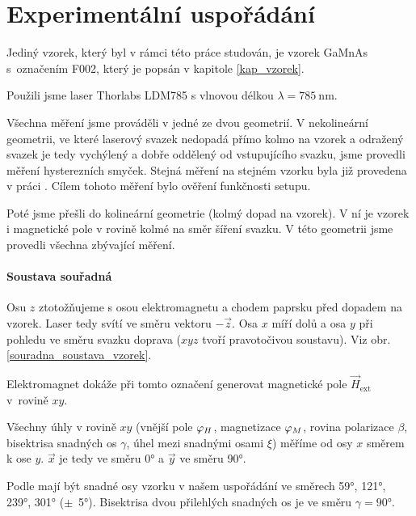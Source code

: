 \chapter{Experimentální uspořádání} \label{exp_usporadani}
Jediný vzorek, který byl v rámci této práce studován, je vzorek GaMnAs s~označením F002, který je popsán v kapitole \ref{kap_vzorek}.

Použili jsme laser Thorlabs LDM785 s vlnovou délkou $\lambda=\SI{785}{\nm}$.

Všechna měření jsme prováděli v jedné ze dvou geometrií. V nekolineární geometrii, ve které laserový svazek nedopadá přímo kolmo na vzorek a odražený svazek je tedy vychýlený a dobře oddělený od vstupujícího svazku, jsme provedli měření hysterezních smyček. Stejná měření na stejném vzorku byla již provedena v práci \cite{Reichlova}. Cílem tohoto měření bylo ověření funkčnosti setupu.

Poté jsme přešli do kolineární geometrie (kolmý dopad na vzorek). V ní je vzorek i magnetické pole v rovině kolmé na směr šíření svazku. V této geometrii jsme provedli všechna zbývající měření.


\subsubsection*{Soustava souřadná}
Osu $z$ ztotožňujeme s osou elektromagnetu a chodem paprsku před dopadem na vzorek. Laser tedy svítí ve směru vektoru $-\vec{z}$.
Osa $x$ míří dolů a osa $y$ při pohledu ve směru svazku doprava ($xyz$ tvoří pravotočivou soustavu). Viz obr. \ref{souradna_soustava_vzorek}.

Elektromagnet dokáže při tomto označení generovat magnetické pole $\vec{H}_{\text{ext}}$ v~rovině $xy$.

Všechny úhly v rovině $xy$ (vnější pole $\varphi_H$, magnetizace $\varphi_M$, rovina polarizace $\beta$, bisektrisa snadných os $\gamma$, úhel mezi snadnými osami $\xi$) měříme od osy $x$ směrem k ose $y$. $\vec{x}$ je tedy ve směru \ang{0} a  $\vec{y}$ ve směru \ang{90}.


Podle \cite{TesarovaDisertace} mají být snadné osy vzorku v našem uspořádání ve směrech \ang{59}, \ang{121}, \ang{239}, \ang{301} ($\pm$~\ang{5}). Bisektrisa dvou přilehlých snadných os je ve směru $\gamma=\ang{90}$.


